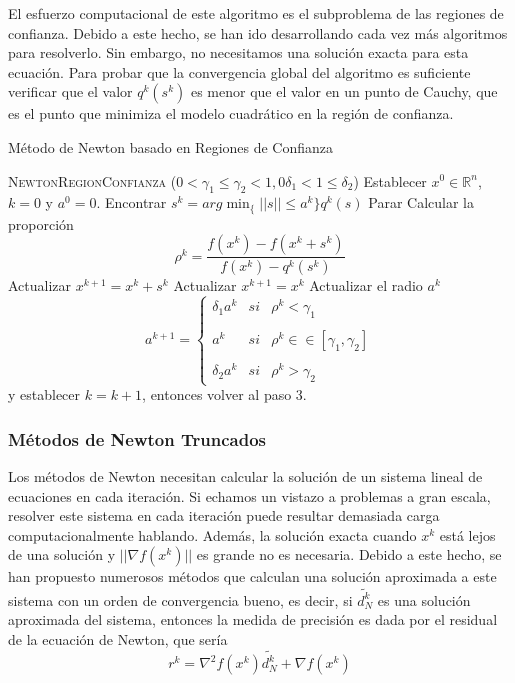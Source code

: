 El esfuerzo computacional de este algoritmo es el subproblema de las regiones de confianza. 
Debido a este hecho, se han ido desarrollando cada vez más algoritmos para resolverlo. 
Sin embargo, no necesitamos una solución exacta para esta ecuación. 
Para probar que la convergencia global del algoritmo es suficiente verificar que el valor $q^k(s^k)$ es menor que el valor en un punto de Cauchy, que es el punto que minimiza el modelo cuadrático en la región de confianza.

\begin{algorithm}[H]
\caption{Método de Newton basado en Regiones de Confianza}\label{alg:TrustRegionNewton}
\begin{algorithmic}[1]
\Procedure \textsc{NewtonRegionConfianza} ($0<\gamma_1\leq\gamma_2<1, 0 \delta_1 < 1 \leq\delta_2$)
\State Establecer $x^0\in\mathbb{R}^n$, $k=0$ y $a^0=0$.
\State Encontrar $s^k = arg \min_\{||s||\leq a^k\}q^k(s)$
	\State Parar
\Else
	\State Calcular la proporción \begin{equation*}
	\rho^k = \dfrac{f(x^k)-f(x^k+s^k)}{f(x^k)-q^k(s^k)}
	\end{equation*}
		\State Actualizar $x^{k+1}=x^k + s^k$
	\Else
		\State Actualizar $x^{k+1} = x^k$
	\EndIf
	\State Actualizar el radio $a^k$
	\begin{equation*}
	a^{k+1} = \left\{ \begin{array}{lcc}
             \delta_1a^k &   si  & \rho^k < \gamma_1 \\
             \\ a^k &  si & \rho^k\in\in [\gamma_1,\gamma_2] \\
             \\ \delta_2a^k & si & \rho^k > \gamma_2
             \end{array}
   \right.
	\end{equation*}
	y establecer $k=k+1$, entonces volver al paso 3.
\EndIf
\EndProcedure
\end{algorithmic}
\end{algorithm}

\subsubsection{Métodos de Newton Truncados}

Los métodos de Newton necesitan calcular la solución de un sistema lineal de ecuaciones en cada iteración. 
Si echamos un vistazo a problemas a gran escala, resolver este sistema en cada iteración puede resultar demasiada carga computacionalmente hablando. 
Además, la solución exacta cuando $x^k$ está lejos de una solución y $||\nabla f(x^k)||$ es grande no es necesaria. 
Debido a este hecho, se han propuesto numerosos métodos que calculan una solución aproximada a este sistema con un orden de convergencia bueno, es decir, si $\widetilde{d^k_N}$ es una solución aproximada del sistema, entonces la medida de precisión es dada por el residual de la ecuación de Newton, que sería 
\begin{equation*}
r^k = \nabla^2 f(x^k)\widetilde{d^k_N} + \nabla f(x^k)
\end{equation*}

